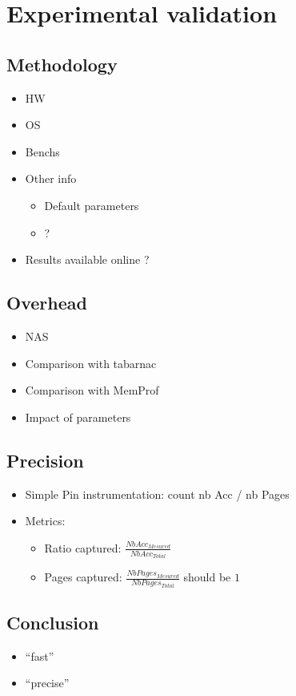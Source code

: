 \section{Experimental validation}
\label{sec:expe}

\subsection{Methodology}
\label{sec:exp-methodo}

\begin{itemize}
    \item HW
    \item OS
    \item Benchs
    \item Other info
        \begin{itemize}
            \item Default parameters
            \item  ?
        \end{itemize}
    \item Results available online ?
\end{itemize}

\subsection{Overhead}
\label{sec:expe-ovh}

\begin{itemize}
    \item NAS
    \item Comparison with tabarnac
    \item Comparison with MemProf
    \item Impact of parameters
\end{itemize}

\subsection{Precision}
\label{sec:expe-precision}

\begin{itemize}
    \item Simple Pin instrumentation: count nb Acc / nb Pages
    \item Metrics:
        \begin{itemize}
            \item Ratio captured: $\frac{NbAcc_{Mesured}}{NbAcc_{Total}}$
            \item Pages captured: $\frac{NbPages_{Mesured}}{NbPages_{Total}}$
                should be $1$
        \end{itemize}
\end{itemize}

\subsection{Conclusion}
\label{sec:expe-cncl}

\begin{itemize}
    \item ``fast''
    \item ``precise''
\end{itemize}
